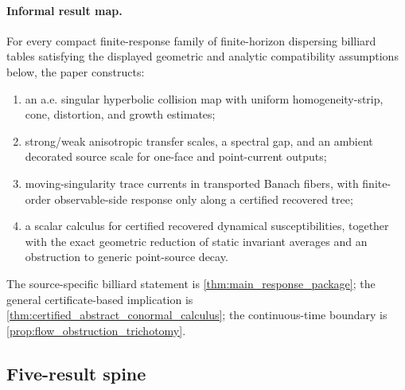 \documentclass[11pt]{amsart}
\theoremstyle{compactplain}
\theoremstyle{compactdefinition}
\theoremstyle{compactremark}
\begin{document}
\paragraph{Informal result map.}
For every compact finite-response family of finite-horizon dispersing billiard
tables satisfying the displayed geometric and analytic compatibility
assumptions below, the paper
constructs:
\begin{enumerate}[label=\textup{(\roman*)},wide,labelindent=0pt]
  \item an a.e. singular hyperbolic collision map with uniform
  homogeneity-strip, cone, distortion, and growth estimates;
  \item strong/weak anisotropic transfer scales, a spectral gap, and an ambient
  decorated source scale for one-face and point-current outputs;
  \item moving-singularity trace currents in transported Banach fibers, with
  finite-order observable-side response only along a certified recovered
  tree;
  \item a scalar calculus for certified recovered dynamical susceptibilities,
  together with the exact geometric reduction of static invariant averages and
  an obstruction to generic point-source decay.
\end{enumerate}
The source-specific billiard statement is \cref{thm:main_response_package};
the general certificate-based implication is
\cref{thm:certified_abstract_conormal_calculus}; the continuous-time boundary
is \cref{prop:flow_obstruction_trichotomy}.

\subsection{Five-result spine}
\end{document}
